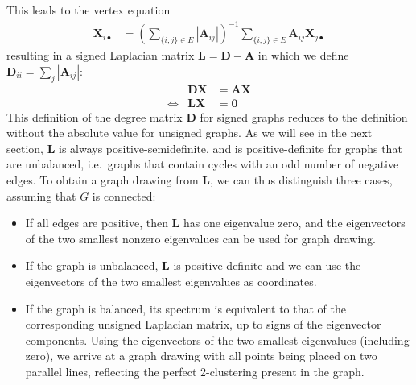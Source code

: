 \documentclass[11pt,a4paper]{book}
\begin{document}
This leads to the vertex equation 
\begin{align}
  \mathbf X_{i \bullet} &= \left( \sum_{\{i,j\}\in E} |\mathbf A_{ij}|\right)^{-1}
  \sum_{\{i,j\}\in E}
  \mathbf A_{ij} \mathbf X_{j \bullet} \label{eq:signed-mean}
\end{align}
resulting in a signed Laplacian matrix $\mathbf L= \mathbf D-\mathbf A$
in which we  
define $\mathbf D_{ii} = \sum_j |\mathbf A_{ij}|$:
\begin{align}
  && \mathbf D \mathbf X &= \mathbf A \mathbf X  & \label{eq:bdx_ax} \\
  &\Leftrightarrow& \mathbf L \mathbf X &= \mathbf 0 & \nonumber
\end{align}
This definition of the degree matrix $\mathbf D$ for signed graphs reduces
to the definition without the absolute value for unsigned graphs. 
As we will see in the next section, $\mathbf L$ is always
positive-semidefinite, and is positive-definite for graphs
that are unbalanced, i.e.\ graphs that contain cycles with an odd number of
negative edges.
To obtain a graph drawing from $\mathbf L$, we can thus distinguish three cases,
assuming that $G$ is connected:
\begin{itemize}
\item If all edges are positive, then $\mathbf L$ has one eigenvalue
  zero, and the eigenvectors of the two smallest nonzero eigenvalues can be
  used for graph drawing. 
\item If the graph is unbalanced, $\mathbf L$ is positive-definite and
  we can use the eigenvectors of the two smallest eigenvalues as
  coordinates.  
\item If the graph is balanced, 
  its spectrum is equivalent to that of the
  corresponding unsigned Laplacian matrix, up to signs of the
  eigenvector components.  Using the eigenvectors of the two smallest
  eigenvalues (including zero), we arrive at a graph drawing with all
  points being placed on two parallel lines, reflecting the perfect
  2-clustering present in the graph. 
\end{itemize}
\end{document}
